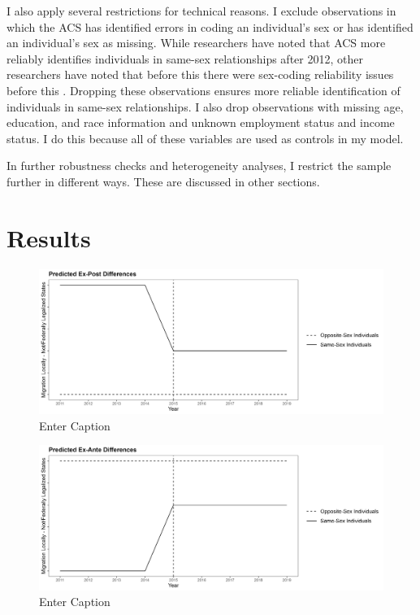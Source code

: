 \documentclass[12pt,letterpaper]{article}
\begin{document}
I also apply several restrictions for technical reasons. I exclude observations in which the ACS has identified errors in coding an individual’s sex or has identified an individual’s sex as missing. While researchers have noted that ACS more reliably identifies individuals in same-sex relationships after 2012, other researchers have noted that before this there were sex-coding reliability issues before this \citep{3, 5, 7, 12}. Dropping these observations ensures more reliable identification of individuals in same-sex relationships. I also drop observations with missing age, education, and race information and unknown employment status and income status. I do this because all of these variables are used as controls in my model.

\begin{landscape}
\begin{centering}
\begin{scriptsize}

\end{scriptsize}
\end{centering}
\end{landscape}

In further robustness checks and heterogeneity analyses, I restrict the sample further in different ways. These are discussed in other sections. 

\clearpage

\section{Results}

\begin{figure}
    \centering
    \includegraphics[width=0.75\linewidth]{outputs/summary_stats/ex_post_diffs.png}
    \caption{Enter Caption}
    \label{fig:enter-label}
\end{figure}

\begin{figure}
    \centering
    \includegraphics[width=0.75\linewidth]{outputs/summary_stats/ex_ante_diffs.png}
    \caption{Enter Caption}
    \label{fig:enter-label}
\end{figure}
\end{document}
